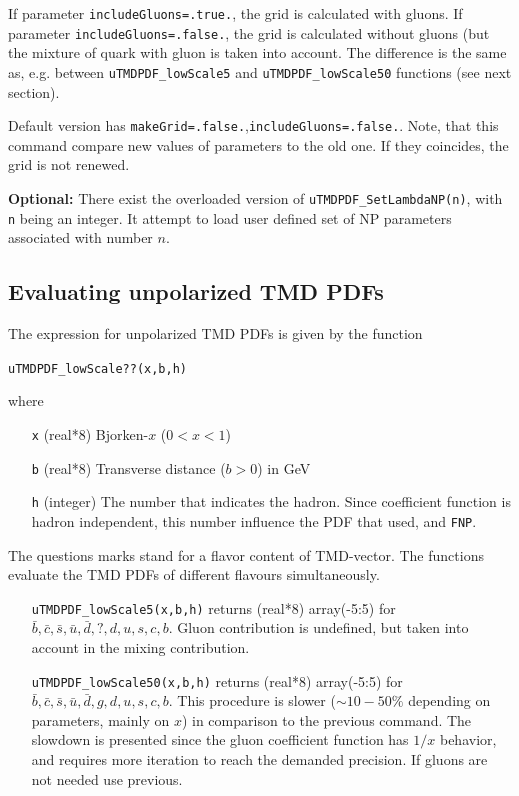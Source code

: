 \documentclass[prd,nofootinbib,eqsecnum,final]{revtex4}
\renewcommand{\(}{\left(}
\renewcommand{\)}{\right)}
\renewcommand{\[}{\left[}
\renewcommand{\]}{\right]}
\begin{document}
If parameter \texttt{includeGluons=.true.}, the grid is calculated with gluons. If parameter \texttt{includeGluons=.false.}, the grid is calculated without gluons (but the mixture of quark with gluon is taken into account. The difference is the same as, e.g. between \texttt{uTMDPDF{\_}lowScale5} and
\texttt{uTMDPDF{\_}lowScale50} functions (see next section).

Default version has \texttt{makeGrid=.false.},\texttt{includeGluons=.false.}. Note, that this command compare new values of parameters to the old one. If they coincides, the grid is not renewed. 

\textbf{Optional:} There exist the overloaded version of \texttt{uTMDPDF{\_}SetLambdaNP(n)}, with \texttt{n} being an integer. It attempt to load user defined set of NP parameters associated with number $n$.

\subsection{Evaluating unpolarized TMD PDFs}
\label{uTMDPDF:TMDPDF}

The expression for unpolarized TMD PDFs is given by the function 

\texttt{uTMDPDF{\_}lowScale??(x,b,h)}

where 
\begin{itemize}
\item [\texttt{x}] (real*8) Bjorken-$x$ ($0<x<1$)
\item [\texttt{b}] (real*8) Transverse distance ($b>0$) in GeV
\item [\texttt{h}] (integer) The number that indicates the hadron. Since coefficient function is hadron independent, this number influence the PDF that used, and \texttt{FNP}.
\end{itemize}
The questions marks stand for a flavor content of TMD-vector. The functions evaluate the TMD PDFs of different flavours simultaneously.
\begin{itemize}
\item[] \texttt{uTMDPDF{\_}lowScale5(x,b,h)} returns (real*8) array(-5:5) for $\bar b,\bar c,\bar s,\bar u,\bar d ,?,d,u,s,c,b$. Gluon contribution is undefined, but taken into account in the mixing contribution. 
\item[] \texttt{uTMDPDF{\_}lowScale50(x,b,h)} returns (real*8) array(-5:5) for $\bar b,\bar c,\bar s,\bar u,\bar d ,g,d,u,s,c,b$. This procedure is slower  ($\sim 10-50\%$ depending on parameters, mainly on $x$) in comparison to the previous command. The slowdown is presented since the gluon coefficient function has $1/x$ behavior, and requires more iteration to reach the demanded precision. If gluons are not needed use previous.
\end{itemize}
\end{document}
